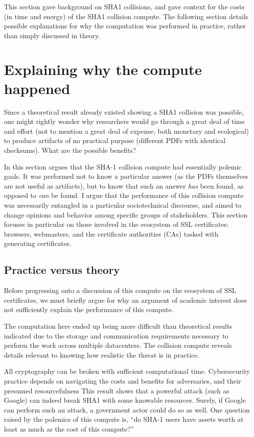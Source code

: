 \documentclass[sigconf]{acmart}
\begin{document}
This section gave background on SHA1 collisions, 
and gave context for the costs (in time and energy) of the SHA1 collision compute.
The following section details possible explanations for why the computation was performed
in practice, rather than simply discussed in theory.


\section{Explaining why the compute happened}
\label{sec:org72cf5b9}

Since a theoretical result already existed showing a SHA1 collision was possible, 
one might rightly wonder why researchers would go through a great deal of time and effort
(not to mention a great deal of expense, both monetary and ecological)
to produce artifacts of no practical purpose (different PDFs with identical checksums).
What are the possible benefits?

In this section argues that
the SHA-1 collision compute had essentially polemic goals.
It was performed not to know a particular answer
(as the PDFs themselves are not useful as artifacts), 
but to know that such an answer \emph{has} been found,
as opposed to \emph{can} be found.
I argue that the performance of this collision compute
was necessarily entangled in a particular sociotechnical discourse,
and aimed to change opinions and behavior among specific groups of stakeholders.
This section focuses in particular on those involved in the ecosystem of SSL certificates: browsers, webmasters, and the certificate authorities (CAs) tasked with generating certificates.

\subsection{Practice versus theory}
\label{sec:org73ff42d}

Before progressing onto a discussion of this compute on the ecosystem of SSL certificates,
we must briefly argue for why an argument of academic interest does not sufficiently explain the performance of this compute.

The computation here ended up being more difficult than theoretical results indicated due to the storage and communication requirements necessary to perform the work across multiple datacenters. 
The collision compute reveals details relevant
to knowing how realistic the threat is in practice. 

All cryptography can be broken with sufficient computational time.
Cybersecurity practice depends on navigating the costs and benefits for adversaries, and their presumed resourcefulness
This result shows that a powerful attack (such as Google) can indeed break SHA1 with some knowable resources.
Surely, if Google can perform such an attack, a government actor could do so as well.
One question raised by the polemics of this compute is, ``do SHA-1 users have assets worth at least as much as the cost of this compute?''
\end{document}
